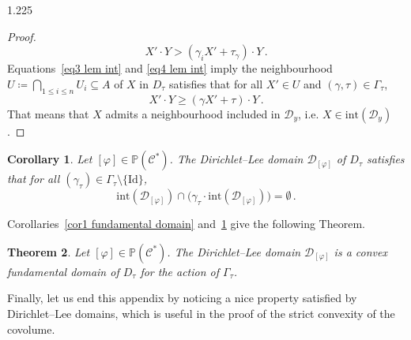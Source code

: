 \documentclass[reqno, a4paper]{amsart}
\numberwithin{equation}{section}
\numberwithin{figure}{section}
\newtheorem{theorem}{Theorem}[section]
\newtheorem{corollary}[theorem]{Corollary}
\theoremstyle{definition}
\theoremstyle{remark}
\renewcommand{\P}{\mathbb{P}} %
\newcommand{\Id}{\mathrm{Id}} %
\newcommand{\C}{\mathcal{C}} %
\newcommand{\DL}{\mathcal{D}} %
\newcommand{\bp}[1]{{\bigl( {#1} \bigr)}} %
\begin{document}
\begin{spacing}{1.225}
\begin{proof}
\begin{equation}
\label{eq4 lem int}
X' \cdot Y >(\gamma_i X' + \tau_\gamma) \cdot Y \, . 
\end{equation}
Equations~\eqref{eq3 lem int} and \eqref{eq4 lem int} imply the neighbourhood $U \coloneqq \bigcap_{1 \leq i \leq n} U_i \subseteq A$ of $X$ in $D_\tau$ satisfies that for all $X' \in U$ and $(\gamma,\tau) \in \Gamma_\tau$, 
\begin{equation*}
 X' \cdot Y \geq (\gamma X' + \tau ) \cdot Y \, . 
\end{equation*}
That means that $X$ admits a neighbourhood included in $\DL_{y}$, i.e. $X \in \mathrm{int}(\DL_{y})$. 
\end{proof}

\begin{corollary}
\label{cor2 fundamental domain}
Let $[\varphi]\in \P(\C^*)$. The Dirichlet--Lee domain $\DL_{[\varphi]}$ of $D_\tau$ satisfies that for all $(\gamma_\tau) \in \Gamma_\tau \setminus\{\Id\}$, 
\begin{equation*}
\mathrm{int}(\DL_{[\varphi]}) \cap \bp{ \gamma_\tau \cdot \mathrm{int}(\DL_{[\varphi]})} = \emptyset \, . 
\end{equation*}
\end{corollary}

Corollaries~\ref{cor1 fundamental domain} and~\ref{cor2 fundamental domain} give the following Theorem. 

\begin{theorem}
\label{theo Dirichlet--Lee domain}
Let $[\varphi]\in \P(\C^*)$. The Dirichlet--Lee domain $\DL_{[\varphi]}$ is a convex fundamental domain of $D_\tau$ for the action of $\Gamma_\tau$. 
\end{theorem}


Finally, let us end this appendix by noticing a nice property satisfied by Dirichlet--Lee domains, which is useful in the proof of the strict convexity of the covolume. 


\end{spacing}
\end{document}
